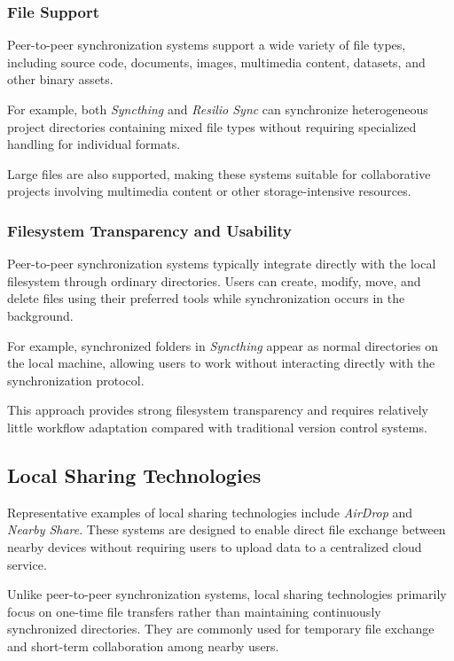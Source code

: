 \subsubsection{File Support}

Peer-to-peer synchronization systems support a wide variety of
file types, including source code, documents, images,
multimedia content, datasets, and other binary assets.

For example, both \textit{Syncthing} and \textit{Resilio Sync}
can synchronize heterogeneous project directories containing
mixed file types without requiring specialized handling for
individual formats.

Large files are also supported, making these systems suitable
for collaborative projects involving multimedia content or
other storage-intensive resources.

\subsubsection{Filesystem Transparency and Usability}

Peer-to-peer synchronization systems typically integrate
directly with the local filesystem through ordinary
directories. Users can create, modify, move, and delete files
using their preferred tools while synchronization occurs in
the background.

For example, synchronized folders in \textit{Syncthing}
appear as normal directories on the local machine, allowing
users to work without interacting directly with the
synchronization protocol.

This approach provides strong filesystem transparency and
requires relatively little workflow adaptation compared with
traditional version control systems.

\subsection{Local Sharing Technologies}

Representative examples of local sharing technologies include
\textit{AirDrop} and \textit{Nearby Share}. These systems are
designed to enable direct file exchange between nearby devices
without requiring users to upload data to a centralized cloud
service.

Unlike peer-to-peer synchronization systems, local sharing
technologies primarily focus on one-time file transfers rather
than maintaining continuously synchronized directories. They
are commonly used for temporary file exchange and short-term
collaboration among nearby users.


